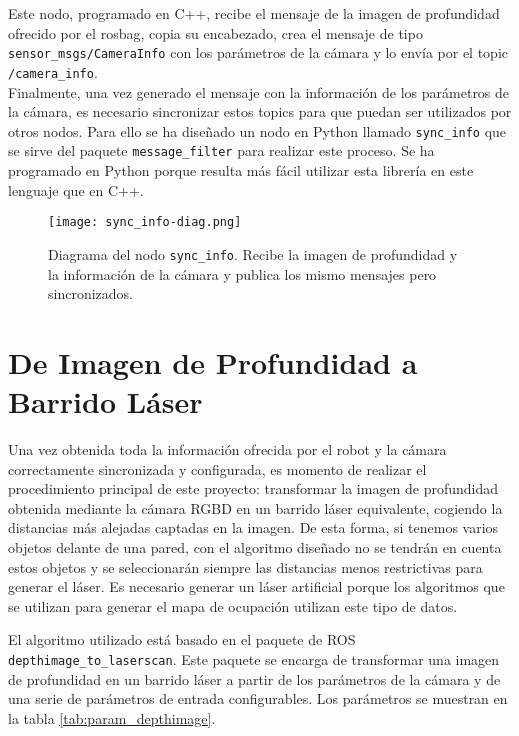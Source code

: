 Este nodo, programado en C++, recibe el mensaje de la imagen de profundidad ofrecido por el rosbag, copia su encabezado, crea el mensaje de tipo \texttt{sensor\_msgs/\-CameraInfo} con los parámetros de la cámara y lo envía por el topic \texttt{/camera\_info}.\\

Finalmente, una vez generado el mensaje con la información de los parámetros de la cámara, es necesario sincronizar estos topics para que puedan ser utilizados por otros nodos. Para ello se ha diseñado un nodo en Python llamado \texttt{sync\_info} que se sirve del paquete \texttt{message\_filter} para realizar este proceso. Se ha programado en Python porque resulta más fácil utilizar esta librería en este lenguaje que en C++.\\

\begin{figure}[h]
	\begin{center} 
		\texttt{[image: sync\_info-diag.png]}
	\end{center}
	\caption{Diagrama del nodo \texttt{sync\_info}. Recibe la imagen de profundidad y la información de la cámara y publica los mismo mensajes pero sincronizados.}
	\label{fig:sync_info}
\end{figure}

\section{De Imagen de Profundidad a Barrido Láser} \label{depthimage_section}

Una vez obtenida toda la información ofrecida por el robot y la cámara correctamente sincronizada y configurada, es momento de realizar el procedimiento principal de este proyecto: transformar la imagen de profundidad obtenida mediante la cámara RGBD en un barrido láser equivalente, cogiendo la distancias más alejadas captadas en la imagen. De esta forma, si tenemos varios objetos delante de una pared, con el algoritmo diseñado no se tendrán en cuenta estos objetos y se seleccionarán siempre las distancias menos restrictivas para generar el láser. Es necesario generar un láser artificial porque los algoritmos que se utilizan para generar el mapa de ocupación utilizan este tipo de datos.\\


\newpage

El algoritmo utilizado está basado en el paquete de ROS \texttt{depthimage\-\_to\_\-laserscan}. Este paquete se encarga de transformar una imagen de profundidad en un barrido láser a partir de los parámetros de la cámara y de una serie de parámetros de entrada configurables. Los parámetros se muestran en la tabla \ref{tab:param_depthimage}.

